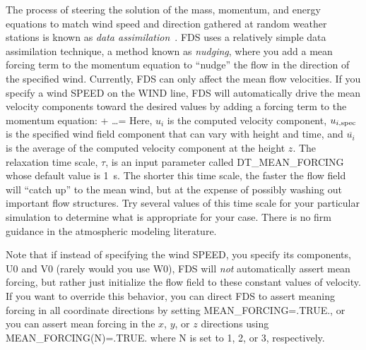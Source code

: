 \documentclass[11pt]{book}
\begin{document}
The process of steering the solution of the mass, momentum, and energy equations to match wind speed and direction gathered at random weather stations is known as \emph{data assimilation}~\cite{Kalnay:2003}. FDS uses a relatively simple data assimilation technique, a method known as \emph{nudging}, where you add a mean forcing term to the momentum equation to ``nudge'' the flow in the direction of the specified wind.  Currently, FDS can only affect the mean flow velocities. If you specify a wind {\ct SPEED} on the {\ct WIND} line, FDS will automatically drive the mean velocity components toward the desired values by adding a forcing term to the momentum equation:
\be
    + \ldots = 
\ee
Here, $u_i$ is the computed velocity component, $u_{i,{\rm spec}}$ is the specified wind field component that can vary with height and time, and $\overline{u_i}$ is the average of the computed velocity component at the height $z$. The relaxation time scale, $\tau$, is an input parameter called {\ct DT\_MEAN\_FORCING} whose default value is 1~s. The shorter this time scale, the faster the flow field will ``catch up'' to the mean wind, but at the expense of possibly washing out important flow structures. Try several values of this time scale for your particular simulation to determine what is appropriate for your case. There is no firm guidance in the atmospheric modeling literature.

Note that if instead of specifying the wind {\ct SPEED}, you specify its components, {\ct U0} and {\ct V0} (rarely would you use {\ct W0}), FDS will {\em not} automatically assert mean forcing, but rather just initialize the flow field to these constant values of velocity. If you want to override this behavior, you can direct FDS to assert meaning forcing in all coordinate directions by setting {\ct MEAN\_FORCING=.TRUE.}, or you can assert mean forcing in the $x$, $y$, or $z$ directions using {\ct MEAN\_FORCING(N)=.TRUE.} where {\ct N} is set to 1, 2, or 3, respectively.
\end{document}
